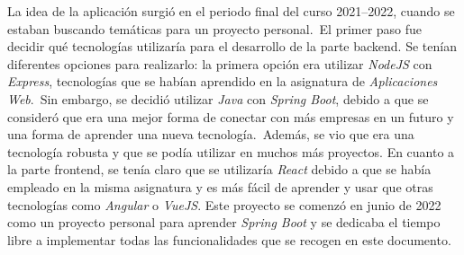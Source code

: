 
La idea de la aplicación surgió en el periodo final del curso 2021--2022, cuando se estaban buscando temáticas para
un proyecto personal.\ El primer paso fue decidir qué tecnologías utilizaría para el desarrollo de la parte backend.
Se tenían diferentes opciones para realizarlo: la primera opción era utilizar \textit{NodeJS} con \textit{Express},
tecnologías que se habían aprendido en la asignatura de \textit{Aplicaciones Web}.\ Sin embargo, se decidió utilizar
\textit{Java} con \textit{Spring Boot}, debido a que se consideró que era una mejor forma de conectar con más
empresas en un futuro y una forma de aprender una nueva tecnología.\ Además, se vio que era una tecnología
robusta y que se podía utilizar en muchos más proyectos.
En cuanto a la parte frontend, se tenía claro que se utilizaría \textit{React} debido a que se había empleado en la
misma asignatura y es más fácil de aprender y usar que otras tecnologías como \textit{Angular} o \textit{VueJS}.
Este proyecto se comenzó en junio de 2022 como un proyecto personal para aprender \textit{Spring Boot} y
se dedicaba el tiempo libre a implementar todas las funcionalidades que se recogen en este documento.
